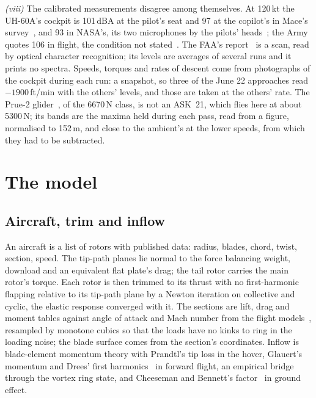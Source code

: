 \documentclass[10pt,a4paper,twocolumn]{article}
\begin{document}
\emph{(viii)} The calibrated measurements disagree among themselves. At 120\,kt the UH-60A's cockpit is 101\,dBA at the pilot's seat and 97 at the copilot's in Mace's survey~\cite{usaarl}, and 93 in NASA's, its two microphones by the pilots' heads~\cite{tm84664}; the Army quotes 106 in flight, the condition not stated~\cite{nas}. The FAA's report~\cite{faa} is a scan, read by optical character recognition; its levels are averages of several runs and it prints no spectra. Speeds, torques and rates of descent come from photographs of the cockpit during each run: a snapshot, so three of the June 22 approaches read $-1900$\,ft/min with the others' levels, and those are taken at the others' rate. The Prue-2 glider~\cite{healy}, of the 6670\,N class, is not an ASK~21, which flies here at about 5300\,N; its bands are the maxima held during each pass, read from a figure, normalised to 152\,m, and close to the ambient's at the lower speeds, from which they had to be subtracted.

\section{The model}\label{sec:model}
\subsection{Aircraft, trim and inflow}
An aircraft is a list of rotors with published data: radius, blades, chord, twist, section, speed. The tip-path planes lie normal to the force balancing weight, download and an equivalent flat plate's drag; the tail rotor carries the main rotor's torque. Each rotor is then trimmed to its thrust with no first-harmonic flapping relative to its tip-path plane by a Newton iteration on collective and cyclic, the elastic response converged with it. The sections are lift, drag and moment tables against angle of attack and Mach number from the flight models~\cite{tr,gh}, resampled by monotone cubics so that the loads have no kinks to ring in the loading noise; the blade surface comes from the section's coordinates. Inflow is blade-element momentum theory with Prandtl's tip loss in the hover, Glauert's momentum and Drees' first harmonics~\cite{drees} in forward flight, an empirical bridge through the vortex ring state, and Cheeseman and Bennett's factor~\cite{cheeseman} in ground effect.
\end{document}
